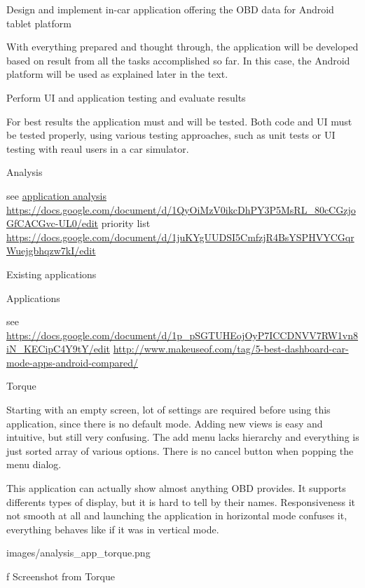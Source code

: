 \seccc Design and implement in-car application offering the OBD data for Android tablet platform

With everything prepared and thought through, the application will be developed based on result from all the tasks accomplished so far. In this case, the Android platform will be used as explained later in the text.

\seccc Perform UI and application testing and evaluate results

For best results the application must and will be tested. Both code and UI must be tested properly, using various testing approaches, such as unit tests or UI testing with reaul users in a car simulator.

\chap Analysis

see \url{application analysis https://docs.google.com/document/d/1QyOiMzV0ikcDhPY3P5MsRL_80cCGzjoGfCACGvc-UL0/edit}
priority list \url{https://docs.google.com/document/d/1juKYgUUDSI5CmfzjR4BsYSPHVYCGqrWuejgbhqzw7kI/edit}

\sec Existing applications


\secc Applications

see \url{https://docs.google.com/document/d/1p_pSGTUHEojOyP7ICCDNVV7RW1vn8iN_KECipC4Y9tY/edit}
\url{http://www.makeuseof.com/tag/5-best-dashboard-car-mode-apps-android-compared/}

\secc Torque

Starting with an empty screen, lot of settings are required before using this application, since there is no default mode. Adding new views is easy and intuitive, but still very confusing. The add menu lacks hierarchy and everything is just sorted array of various options. There is no cancel button when popping the menu dialog.

This application can actually show almost anything OBD provides. It supports differents types of display, but it is hard to tell by their names. Responsiveness it not smooth at all and launching the application in horizontal mode confuses it, everything behaves like if it was in vertical mode.


\medskip
\centerline{\inspic images/analysis_app_torque.png }\nobreak\medskip
\caption/f Screenshot from Torque

